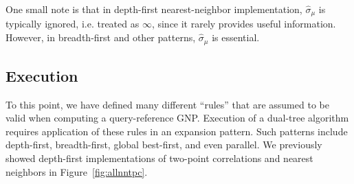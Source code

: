 \documentclass[twoside,leqno,twocolumn]{article}
\newcommand{\summary}{\hat{\sigma}}
\newcommand{\fig}[1]{Figure~\ref{fig:#1}}
\newcommand{\lettermu}{\mu}
\newcommand{\deltamu}{\summary_{\!\lettermu}}
\begin{document}
\noindent One small note is that in depth-first nearest-neighbor implementation, $\deltamu$ is typically ignored, i.e. treated as $\infty$, since it rarely provides useful information.
However, in breadth-first and other patterns, $\deltamu$ is essential.

\subsection{Execution}

To this point, we have defined many different ``rules'' that are assumed to be valid when computing a query-reference GNP.
Execution of a dual-tree algorithm requires application of these rules in an expansion pattern.
Such patterns include depth-first, breadth-first, global best-first, and even parallel.
We previously showed depth-first implementations of two-point correlations and nearest neighbors in \fig{allnntpc}.
\end{document}
